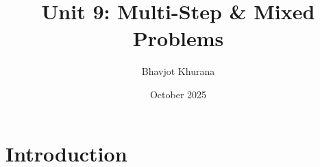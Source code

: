 \documentclass{article}
\title{Unit 9: Multi-Step & Mixed Problems}
\author{Bhavjot Khurana}
\date{October 2025}
\begin{document}
\maketitle

\section{Introduction}
\end{document}
